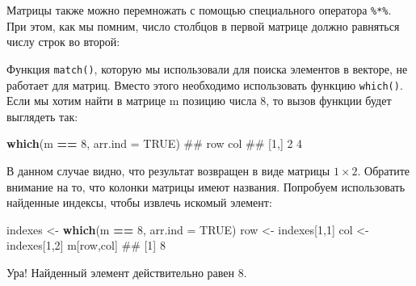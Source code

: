 \documentclass[]{book}
\newenvironment{Shaded}{\begin{snugshade}}{\end{snugshade}}
\newcommand{\KeywordTok}[1]{\textcolor[rgb]{0.13,0.29,0.53}{\textbf{#1}}}
\newcommand{\DataTypeTok}[1]{\textcolor[rgb]{0.13,0.29,0.53}{#1}}
\newcommand{\DecValTok}[1]{\textcolor[rgb]{0.00,0.00,0.81}{#1}}
\newcommand{\StringTok}[1]{\textcolor[rgb]{0.31,0.60,0.02}{#1}}
\newcommand{\CommentTok}[1]{\textcolor[rgb]{0.56,0.35,0.01}{\textit{#1}}}
\newcommand{\OtherTok}[1]{\textcolor[rgb]{0.56,0.35,0.01}{#1}}
\newcommand{\OperatorTok}[1]{\textcolor[rgb]{0.81,0.36,0.00}{\textbf{#1}}}
\newcommand{\NormalTok}[1]{#1}
\begin{document}
Матрицы также можно перемножать с помощью специального оператора
\texttt{\%*\%}. При этом, как мы помним, число столбцов в первой матрице
должно равняться числу строк во второй:

\begin{Shaded}
\end{Shaded}

Функция \texttt{match()}, которую мы использовали для поиска элементов в
векторе, не работает для матриц. Вместо этого необходимо использовать
функцию \texttt{which()}. Если мы хотим найти в матрице m позицию числа
\(8\), то вызов функции будет выглядеть так:

\begin{Shaded}
\begin{Highlighting}[]
\KeywordTok{which}\NormalTok{(m }\OperatorTok{==}\StringTok{ }\DecValTok{8}\NormalTok{, }\DataTypeTok{arr.ind =} \OtherTok{TRUE}\NormalTok{)}
\NormalTok{##      row col}
\NormalTok{## [1,]   2   4}
\end{Highlighting}
\end{Shaded}

В данном случае видно, что результат возвращен в виде матрицы
\(1 \times 2\). Обратите внимание на то, что колонки матрицы имеют
названия. Попробуем использовать найденные индексы, чтобы извлечь
искомый элемент:

\begin{Shaded}
\begin{Highlighting}[]
\NormalTok{indexes <-}\StringTok{ }\KeywordTok{which}\NormalTok{(m }\OperatorTok{==}\StringTok{ }\DecValTok{8}\NormalTok{, }\DataTypeTok{arr.ind =} \OtherTok{TRUE}\NormalTok{)}
\NormalTok{row <-}\StringTok{ }\NormalTok{indexes[}\DecValTok{1}\NormalTok{,}\DecValTok{1}\NormalTok{]}
\NormalTok{col <-}\StringTok{ }\NormalTok{indexes[}\DecValTok{1}\NormalTok{,}\DecValTok{2}\NormalTok{]}
\NormalTok{m[row,col]}
\NormalTok{## [1] 8}
\end{Highlighting}
\end{Shaded}

Ура! Найденный элемент действительно равен \(8\).
\end{document}
